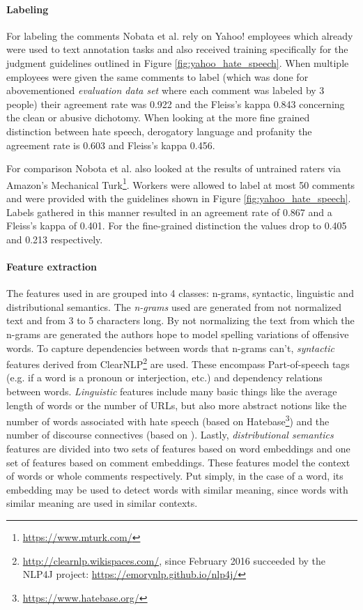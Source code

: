 \documentclass{proseminar}
\begin{document}
\paragraph{Labeling}
For labeling the comments Nobata et al. rely on Yahoo! employees which already were used to text annotation tasks and also received training specifically for the judgment guidelines outlined in Figure \ref{fig:yahoo_hate_speech}. When multiple employees were given the same comments to label (which was done for abovementioned \emph{evaluation data set} where each comment was labeled by 3 people) their agreement rate was 0.922 and the Fleiss's kappa 0.843 concerning the clean or abusive dichotomy. When looking at the more fine grained distinction between hate speech, derogatory language and profanity the agreement rate is 0.603 and Fleiss's kappa 0.456.

For comparison Nobota et al. also looked at the results of untrained raters via Amazon's Mechanical Turk\footnote{\url{https://www.mturk.com/}}. Workers were allowed to label at most 50 comments and were provided with the guidelines shown in Figure \ref{fig:yahoo_hate_speech}. Labels gathered in this manner resulted in an agreement rate of 0.867 and a Fleiss's kappa of 0.401. For the fine-grained distinction the values drop to 0.405 and 0.213 respectively.

\paragraph{Feature extraction} The features used in \cite{Yahoo:2016} are grouped into 4 classes: n-grams, syntactic, linguistic and distributional semantics. The \emph{n-grams} used are generated from not normalized text and from 3 to 5 characters long. By not normalizing the text from which the n-grams are generated the authors hope to model spelling variations of offensive words. To capture dependencies between words that n-grams can't, \emph{syntactic} features derived from ClearNLP\footnote{\url{http://clearnlp.wikispaces.com/}, since February 2016 succeeded by the NLP4J project: \url{https://emorynlp.github.io/nlp4j/}} are used. These encompass Part-of-speech tags (e.g. if a word is a pronoun or interjection, etc.) and dependency relations between words. \emph{Linguistic} features include many basic things like the average length of words or the number of URLs, but also more abstract notions like the number of words associated with hate speech (based on Hatebase\footnote{\url{https://www.hatebase.org/}}) and the number of discourse connectives (based on \cite{Pitler:2009}). Lastly, \emph{distributional semantics} features are divided into two sets of features based on word embeddings and one set of features based on comment embeddings. These features model the context of words or whole comments respectively. Put simply, in the case of a word, its embedding may be used to detect words with similar meaning, since words with similar meaning are used in similar contexts.
\end{document}
